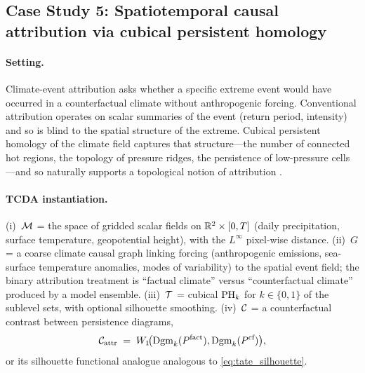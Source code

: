 \subsection{Case Study 5: Spatiotemporal causal attribution via
cubical persistent homology}\label{sec:cs_climate}

\paragraph{Setting.}
Climate-event attribution asks whether a specific extreme event would
have occurred in a counterfactual climate without anthropogenic
forcing. Conventional attribution operates on scalar summaries of the
event (return period, intensity) and so is blind to the spatial
structure of the extreme. Cubical persistent homology of the climate
field captures that structure---the number of connected hot regions,
the topology of pressure ridges, the persistence of low-pressure
cells---and so naturally supports a topological notion of attribution
\citep{strommen2025topological,smith2025multiscale,smith2025harnessing}.

\paragraph{TCDA instantiation.}
(i)~$\mathcal{M}$ = the space of gridded scalar fields on $\mathbb{R}^2 \times [0,T]$
(daily precipitation, surface temperature, geopotential height), with
the $L^\infty$ pixel-wise distance. (ii)~$G$ = a coarse climate causal
graph linking forcing (anthropogenic emissions, sea-surface
temperature anomalies, modes of variability) to the spatial event
field; the binary attribution treatment is ``factual climate'' versus
``counterfactual climate'' produced by a model ensemble.
(iii)~$\mathcal{T}$ = cubical $\mathrm{PH}_{k}$ for $k \in \{0,1\}$ of the sublevel
sets, with optional silhouette smoothing. (iv)~$\mathcal{C}$ = a
counterfactual contrast between persistence diagrams,
\begin{equation}
  \mathcal{C}_{\mathrm{attr}}
  \;=\; W_1\!\bigl(\mathrm{Dgm}_{k}(P^{\text{fact}}),
                   \mathrm{Dgm}_{k}(P^{\text{cf}})\bigr),
  \label{eq:climate_contrast}
\end{equation}
or its silhouette functional analogue analogous to
\cref{eq:tate_silhouette}.

